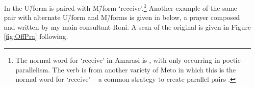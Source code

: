 \newpage
\begin{exe}
	\label{ex:120715-0, 0.45-0.58}
	\begin{xlist}
		\vspace{4pt}
		\label{ex:120715-0, 0.51}
	\end{xlist}
\end{exe}

In  the U\=/form  is paired with M\=/form  `receive'.\footnote{
		The normal word for `receive' in Amarasi is ,
		with  only occurring in poetic parallelism.
		The verb  is from another variety of Meto
		in which this is the normal word for `receive'
		-- a common strategy to create parallel pairs \citep[27f]{grth97}.}
Another example of the same pair with
alternate U\=/form and M\=/forms is given in  below,
a prayer composed and written by my main consultant Roni.
A scan of the original is given in Figure \ref{fig:OffPra} following.

